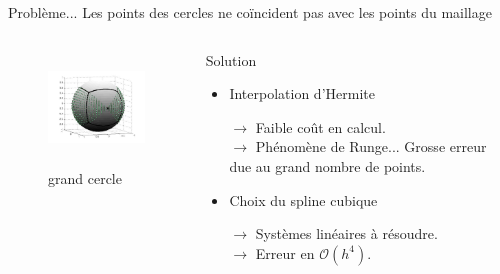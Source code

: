 \documentclass[11pt]{beamer}
\begin{document}
\begin{frame}

  \begin{alertblock}{Problème...}
  Les points des cercles ne coïncident pas avec les points du maillage  
  \end{alertblock}
  
\begin{columns}

\begin{figure}
\begin{center}
\includegraphics[height=3cm]{fig22.jpg}
\end{center}
\caption{grand cercle}
\end{figure}

\pause
{}

\begin{exampleblock}{Solution}
  \begin{itemize}
  \item Interpolation d'Hermite

    $\rightarrow$ Faible coût en calcul. \\
    $\rightarrow$ Phénomène de Runge... Grosse erreur due au grand nombre de points.

  \item Choix du spline cubique

    $\rightarrow$ Systèmes linéaires à résoudre.\\
    $\rightarrow$ Erreur en $\mathcal{O}\left( h^4 \right)$.
  \end{itemize}
\end{exampleblock}

\end{columns}

\end{frame}

\end{document}
